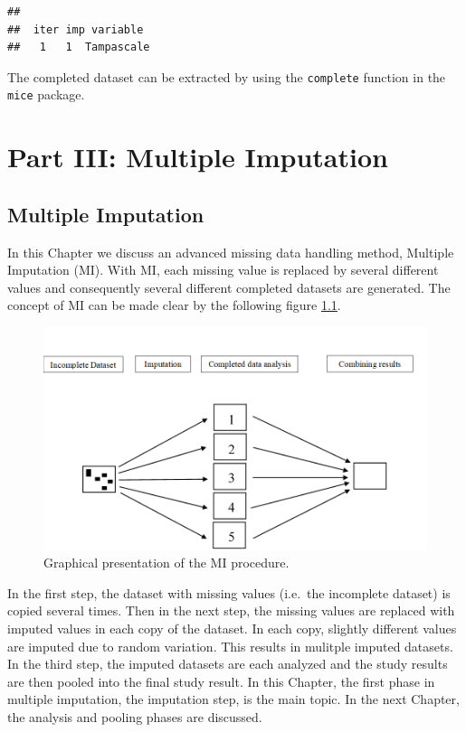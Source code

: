 \documentclass[
]{book}
\begin{document}
\begin{verbatim}
## 
##  iter imp variable
##   1   1  Tampascale
\end{verbatim}

The completed dataset can be extracted by using the \texttt{complete} function in the \texttt{mice} package.

\hypertarget{part-part-iii-multiple-imputation}{%
\part{Part III: Multiple Imputation}\label{part-part-iii-multiple-imputation}}

\hypertarget{multiple-imputation}{%
\chapter{Multiple Imputation}\label{multiple-imputation}}

In this Chapter we discuss an advanced missing data handling method, Multiple Imputation (MI). With MI, each missing value is replaced by several different values and consequently several different completed datasets are generated. The concept of MI can be made clear by the following figure \ref{fig:fig4-1}.

\begin{figure}

{\centering \includegraphics[width=0.9\linewidth]{images/fig4.1} 

}

\caption{Graphical presentation of the MI procedure.}\label{fig:fig4-1}
\end{figure}

In the first step, the dataset with missing values (i.e.~the incomplete dataset) is copied several times. Then in the next step, the missing values are replaced with imputed values in each copy of the dataset. In each copy, slightly different values are imputed due to random variation. This results in mulitple imputed datasets. In the third step, the imputed datasets are each analyzed and the study results are then pooled into the final study result. In this Chapter, the first phase in multiple imputation, the imputation step, is the main topic. In the next Chapter, the analysis and pooling phases are discussed.
\end{document}
